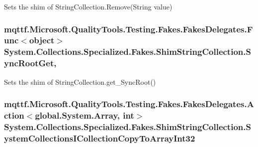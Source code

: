 Sets the shim of String\-Collection.\-Remove(\-String value)

\hypertarget{class_system_1_1_collections_1_1_specialized_1_1_fakes_1_1_shim_string_collection_a52b11a85bda01a8ce563fd062a83cd18}{
\subsubsection[{Sync\-Root\-Get}]{\setlength{\rightskip}{0pt plus 5cm}mqttf.\-Microsoft.\-Quality\-Tools.\-Testing.\-Fakes.\-Fakes\-Delegates.\-Func$<$object$>$ System.\-Collections.\-Specialized.\-Fakes.\-Shim\-String\-Collection.\-Sync\-Root\-Get\hspace{0.3cm}{\ttfamily [get]}, {\ttfamily [set]}}}\label{class_system_1_1_collections_1_1_specialized_1_1_fakes_1_1_shim_string_collection_a52b11a85bda01a8ce563fd062a83cd18}


Sets the shim of String\-Collection.\-get\-\_\-\-Sync\-Root()

\hypertarget{class_system_1_1_collections_1_1_specialized_1_1_fakes_1_1_shim_string_collection_af782a8f5d26ea886266a42fa7a74cfab}{
\subsubsection[{System\-Collections\-I\-Collection\-Copy\-To\-Array\-Int32}]{\setlength{\rightskip}{0pt plus 5cm}mqttf.\-Microsoft.\-Quality\-Tools.\-Testing.\-Fakes.\-Fakes\-Delegates.\-Action$<$global.\-System.\-Array, int$>$ System.\-Collections.\-Specialized.\-Fakes.\-Shim\-String\-Collection.\-System\-Collections\-I\-Collection\-Copy\-To\-Array\-Int32\hspace{0.3cm}{\ttfamily [set]}}}\label{class_system_1_1_collections_1_1_specialized_1_1_fakes_1_1_shim_string_collection_af782a8f5d26ea886266a42fa7a74cfab}


